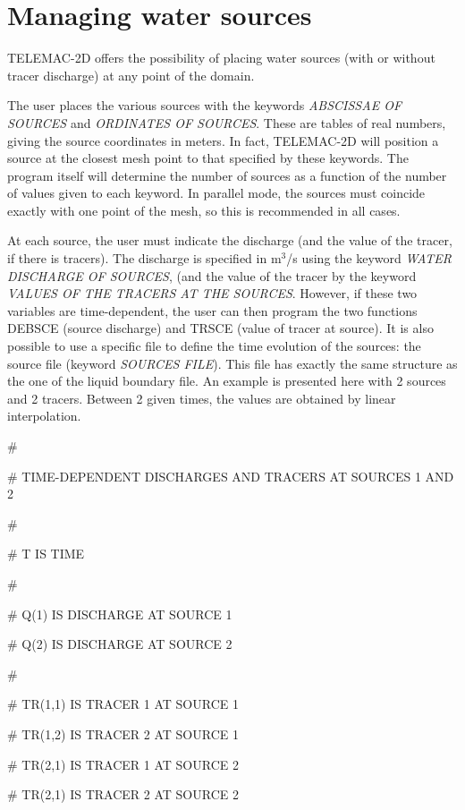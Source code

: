 


\chapter{ Managing water sources}

 TELEMAC-2D offers the possibility of placing water sources (with or without tracer discharge) at any point of the domain.

 The user places the various sources with the keywords \textit{ABSCISSAE OF SOURCES} and \textit{ORDINATES OF SOURCES}. These are tables of real numbers, giving the source coordinates in meters. In fact, TELEMAC-2D will position a source at the closest mesh point to that specified by these keywords. The program itself will determine the number of sources as a function of the number of values given to each keyword. In parallel mode, the sources must coincide exactly with one point of the mesh, so this is recommended in all cases.

 At each source, the user must indicate the discharge (and the value of the tracer, if there is tracers). The discharge is specified in m${}^{3}$/s using the keyword \textit{WATER DISCHARGE OF SOURCES}, (and the value of the tracer by the keyword \textit{VALUES OF THE TRACERS AT THE SOURCES}. However, if these two variables are time-dependent, the user can then program the two functions DEBSCE (source discharge) and TRSCE (value of tracer at source). It is also possible to use a specific file to define the time evolution of the sources: the source file (keyword \textit{SOURCES FILE}). This file has exactly the same structure as the one of the liquid boundary file. An example is presented here with 2 sources and 2 tracers. Between 2 given times, the values are obtained by linear interpolation.

 \#

 \# TIME-DEPENDENT DISCHARGES AND TRACERS AT SOURCES 1 AND 2

 \#

 \#  T IS TIME

 \#

 \#  Q(1) IS DISCHARGE AT SOURCE 1

 \#  Q(2) IS DISCHARGE AT SOURCE 2

 \#

 \#  TR(1,1) IS TRACER 1 AT SOURCE 1

 \#  TR(1,2) IS TRACER 2 AT SOURCE 1

 \#  TR(2,1) IS TRACER 1 AT SOURCE 2

 \#  TR(2,1) IS TRACER 2 AT SOURCE 2

